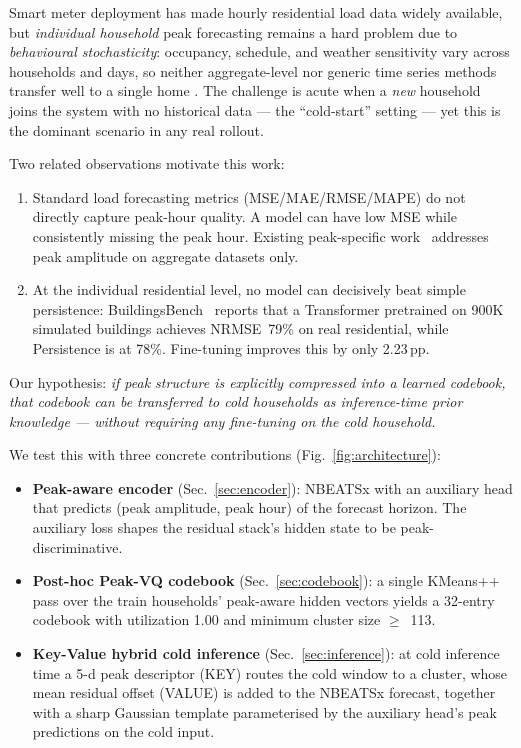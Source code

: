 \documentclass[conference]{IEEEtran}
\begin{document}
Smart meter deployment has made hourly residential load data widely
available, but \emph{individual household} peak forecasting remains a hard
problem due to \textit{behavioural stochasticity}: occupancy, schedule, and
weather sensitivity vary across households and days, so neither
aggregate-level nor generic time series methods transfer well to a single
home \cite{peng2019aggregation,huang2019loadcnn}. The challenge is acute when
a \emph{new} household joins the system with no historical data --- the
``cold-start'' setting --- yet this is the dominant scenario in any real
rollout.

Two related observations motivate this work:
\begin{enumerate}
\item Standard load forecasting metrics (MSE/MAE/RMSE/MAPE) do not directly
capture peak-hour quality. A model can have low MSE while consistently
missing the peak hour. Existing peak-specific work~\cite{zhang2023seq2peak}
addresses peak amplitude on aggregate datasets only.
\item At the individual residential level, no model can decisively beat
simple persistence: BuildingsBench~\cite{emami2023buildingsbench} reports
that a Transformer pretrained on 900K simulated buildings achieves
NRMSE~79\% on real residential, while Persistence is at 78\%. Fine-tuning
improves this by only 2.23\,pp.
\end{enumerate}

Our hypothesis: \emph{if peak structure is explicitly compressed into a
learned codebook, that codebook can be transferred to cold households as
inference-time prior knowledge --- without requiring any fine-tuning on the
cold household.}

We test this with three concrete contributions
(Fig.~\ref{fig:architecture}):
\begin{itemize}
\item \textbf{Peak-aware encoder} (Sec.~\ref{sec:encoder}): NBEATSx with an
auxiliary head that predicts (peak amplitude, peak hour) of the forecast
horizon. The auxiliary loss shapes the residual stack's hidden state to be
peak-discriminative.
\item \textbf{Post-hoc Peak-VQ codebook} (Sec.~\ref{sec:codebook}): a single
KMeans++ pass over the train households' peak-aware hidden vectors yields a
32-entry codebook with utilization 1.00 and minimum cluster size $\geq$~113.
\item \textbf{Key-Value hybrid cold inference} (Sec.~\ref{sec:inference}): at
cold inference time a 5-d peak descriptor (KEY) routes the cold window to a
cluster, whose mean residual offset (VALUE) is added to the NBEATSx
forecast, together with a sharp Gaussian template parameterised by the
auxiliary head's peak predictions on the cold input.
\end{itemize}
\end{document}
